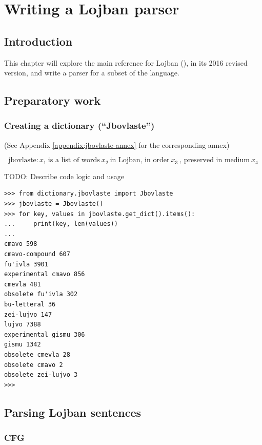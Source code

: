 \chapter{Writing a Lojban parser}

\section{Introduction}

This chapter will explore the main reference for Lojban (\cite{cowan1997complete}), in its 2016 revised version, and write a parser for a subset of the language.

\section{Preparatory work}

\subsection{Creating a dictionary (``Jbovlaste'')}
\label{sub:creating_a_dictionary}

(See Appendix \ref{appendix:jbovlaste-annex} for the corresponding annex)

$$\text{jbovlaste}: x_1 \: \text{is a list of words} \: x_2 \: \text{in Lojban, in order} \: x_3 \: \text{, preserved in medium} \: x_4$$

TODO: Describe code logic and usage

\newpage

\begin{lstlisting}
>>> from dictionary.jbovlaste import Jbovlaste
>>> jbovlaste = Jbovlaste()
>>> for key, values in jbovlaste.get_dict().items():
...     print(key, len(values))
...
cmavo 598
cmavo-compound 607
fu'ivla 3901
experimental cmavo 856
cmevla 481
obsolete fu'ivla 302
bu-letteral 36
zei-lujvo 147
lujvo 7388
experimental gismu 306
gismu 1342
obsolete cmevla 28
obsolete cmavo 2
obsolete zei-lujvo 3
>>>
\end{lstlisting}

\section{Parsing Lojban sentences}
\label{sec:parsing_lojban_sentences}

\subsection{CFG}
\label{sub:cfg}

